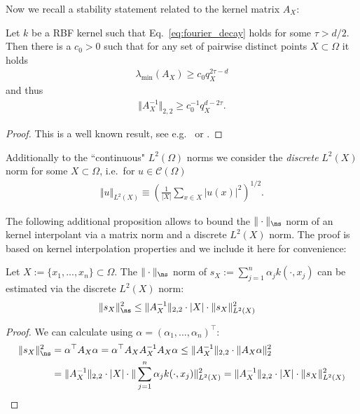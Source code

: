 \documentclass[a4paper, 10pt]{article}
\begin{document}
Now we recall a stability statement related to the kernel matrix $A_X$:

\begin{theorem}
\label{th:stability_statement}
Let $k$ be a RBF kernel such that Eq.~\eqref{eq:fourier_decay} holds for some $\tau > d/2$. 
Then there is a $c_0 > 0$ such that for any set of pairwise distinct points $X \subset \Omega$ it holds
\begin{align*}
\lambda_{\min}(A_{X}) \geq c_0 q_{X}^{2\tau - d}
\end{align*}
and thus
\begin{align*}
\Vert A_X^{-1} \Vert_{2,2} \geq c_0^{-1} q_{X}^{d - 2\tau}.
\end{align*}
\end{theorem}

\begin{proof}
This is a well known result, see e.g.\ \cite{schaback1995error} or \cite[Chapter 12.2]{wendland2005scattered}.
\end{proof}

%
%
%
%
%
%
%
%
%
%
%
%
%
%
%
%
%
%
%


Additionally to the ``continuous" $L^2(\Omega)$ norms we consider the \textit{discrete} $L^2(X)$ norm for some $X \subset \Omega$, i.e.\ for $u \in \mathcal{C}(\Omega)$ %
%
\begin{align*}
%
\Vert u \Vert_{L^2(X)} \equiv \left( \frac{1}{|X|} \sum_{x \in X} |u(x)|^2 \right)^{1/2}.
\end{align*}

The following additional proposition allows to bound the ${\Vert \cdot \Vert_{\ns}}$ norm of an kernel interpolant via a matrix norm and a discrete $L^2(X)$ norm.
The proof is based on kernel interpolation properties and we include it here for convenience:

\begin{prop}
\label{prop:upper_bound_ns_norm_via_L2}
Let $X := \{x_1, ..., x_n\} \subset \Omega$. 
The $\Vert \cdot \Vert_{\ns}$ norm of $s_X := \sum_{j=1}^n \alpha_j k(\cdot, x_j)$ can be estimated via the discrete $L^2(X)$ norm:
\begin{align*}
\Vert s_X \Vert_{\ns}^2 &\leq \Vert A_X^{-1} \Vert_{2,2} \cdot |X| \cdot \Vert s_X \Vert_{L^2(X)}^2
\end{align*}
\end{prop}

\begin{proof}
We can calculate using $\alpha = (\alpha_1, ..., \alpha_n)^\top$:
\begin{align*}
\Vert s_X \Vert_{\ns}^2 &= \alpha^\top A_{X} \alpha = \alpha^\top A_{X} A_{X}^{-1} A_{X} \alpha 
\leq \Vert A_X^{-1} \Vert_{2,2} \cdot \Vert A_X \alpha \Vert_{2}^2 \\
& = \Vert A_X^{-1} \Vert_{2,2} \cdot |X| \cdot \Vert \sum_{j=1}^n \alpha_j k(\cdot, x_j) \Vert_{L^2(X)}^2 = \Vert A_X^{-1} \Vert_{2,2} \cdot |X| \cdot \Vert s_X \Vert_{L^2(X)}^2
\end{align*}
\end{proof}
\end{document}
